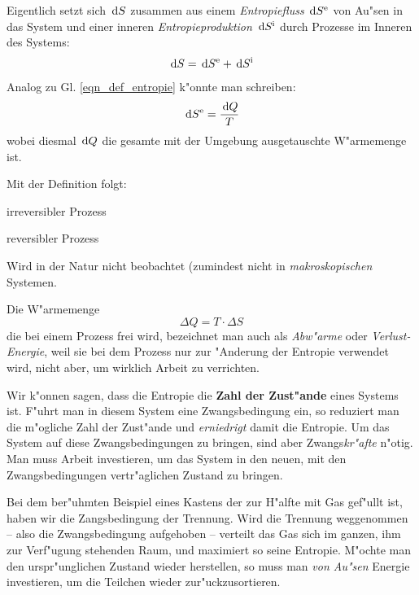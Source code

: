 Eigentlich setzt sich $\, \mathrm{d} S$ zusammen aus einem
\emph{Entropiefluss} $\, \mathrm{d} S^\text{e}$ von Au"sen in das System und
einer inneren \emph{Entropieproduktion} $\, \mathrm{d} S^\text{i}$ durch
Prozesse im Inneren des Systems:
\begin{equation}
 \, \mathrm{d} S = \, \mathrm{d} S ^\text{e} + \, \mathrm{d} S^\text{i}
\end{equation}
Analog zu Gl. \eqref{eqn_def_entropie} k"onnte man schreiben:
\begin{equation*}
   \, \mathrm{d} S^\text{e} = \frac{\, \mathrm{d} Q}{T}
\end{equation*}
wobei diesmal $\, \mathrm{d} Q$ die gesamte mit der Umgebung ausgetauschte
W"armemenge ist. 

Mit der Definition folgt:
\begin{description}[\setlabelstyle{\bfseries\slshape}]
\item[$\Delta S > 0$] irreversibler Prozess
\item[$\Delta S = 0$] reversibler Prozess
\item[$\Delta S < 0$] Wird in der Natur nicht beobachtet (zumindest
   nicht in \emph{makroskopischen} Systemen.
\end{description}
Die W"armemenge
\begin{equation*}
   \Delta Q = T \cdot \Delta S
\end{equation*}
die bei einem Prozess frei wird, bezeichnet man auch als
\emph{Abw"arme} oder
\emph{Verlust-Energie}, weil sie bei dem
Prozess nur zur "Anderung der Entropie verwendet wird, nicht aber, um
wirklich Arbeit zu verrichten.

Wir k"onnen sagen, dass die Entropie die \textbf{Zahl der Zust"ande}
eines Systems ist. F"uhrt man in diesem System eine
Zwangsbedingung ein, so reduziert man die
m"ogliche Zahl der Zust"ande und \emph{erniedrigt} damit die
Entropie. Um das System auf diese Zwangsbedingungen zu bringen, sind
aber Zwangs\emph{kr"afte} n"otig. Man muss Arbeit investieren, um das
System in den neuen, mit den Zwangsbedingungen vertr"aglichen Zustand
zu bringen.

\begin{Beispiel}
   Bei dem ber"uhmten Beispiel eines Kastens der zur H"alfte mit Gas
   gef"ullt ist, haben wir die Zangsbedingung der Trennung. Wird die
   Trennung weggenommen -- also die Zwangsbedingung aufgehoben --
   verteilt das Gas sich im ganzen, ihm zur Verf"ugung stehenden Raum,
   und maximiert so seine Entropie. M"ochte man den urspr"unglichen
   Zustand wieder herstellen, so muss man \emph{von Au"sen} Energie
   investieren, um die Teilchen wieder zur"uckzusortieren.
\end{Beispiel}


